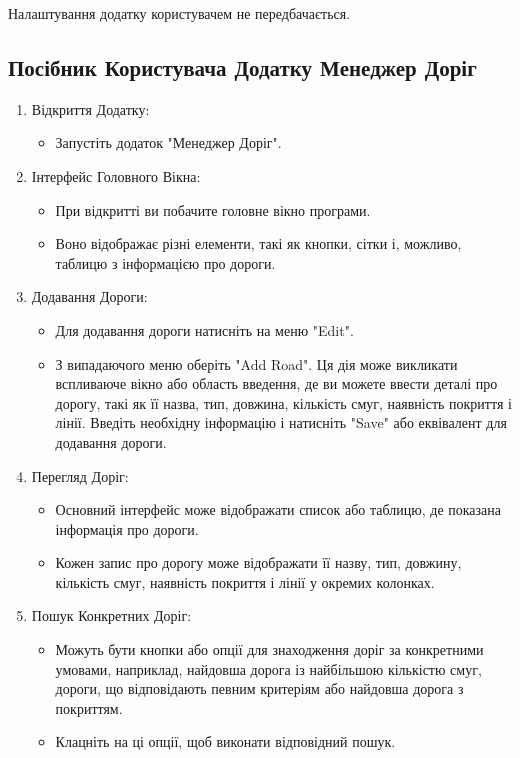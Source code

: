 \documentclass[14pt]{extarticle}
\begin{document}
Налаштування додатку користувачем не передбачається.

\subsection{Посібник Користувача Додатку Менеджер Доріг}

\begin{enumerate}
    

\item    Відкриття Додатку:
        \begin{itemize}
            
        \item Запустіть додаток "Менеджер Доріг".
        \end{itemize}

\item    Інтерфейс Головного Вікна:
        \begin{itemize}
        \item При відкритті ви побачите головне вікно програми.
        \item Воно відображає різні елементи, такі як кнопки, сітки і, можливо, таблицю з інформацією про дороги.
        \end{itemize}

\item    Додавання Дороги:
        \begin{itemize}
        \item Для додавання дороги натисніть на меню "Edit".
        \item З випадаючого меню оберіть "Add Road".
        Ця дія може викликати вспливаюче вікно або область введення, де ви можете ввести деталі про дорогу, такі як її назва, тип, довжина, кількість смуг, наявність покриття і лінії. Введіть необхідну інформацію і натисніть "Save" або еквівалент для додавання дороги.
        \end{itemize}

\item    Перегляд Доріг:
        \begin{itemize}
        \item Основний інтерфейс може відображати список або таблицю, де показана інформація про дороги.
        \item Кожен запис про дорогу може відображати її назву, тип, довжину, кількість смуг, наявність покриття і лінії у окремих колонках.
        \end{itemize}

\item    Пошук Конкретних Доріг:
        \begin{itemize}
        \item Можуть бути кнопки або опції для знаходження доріг за конкретними умовами, наприклад, найдовша дорога із найбільшою кількістю смуг, дороги, що відповідають певним критеріям або найдовша дорога з покриттям.
        \item Клацніть на ці опції, щоб виконати відповідний пошук.
        \end{itemize}


\end{enumerate}
\end{document}
